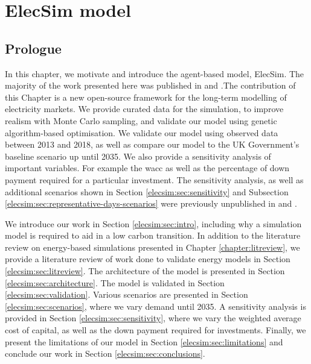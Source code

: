 \chapter{ElecSim model}
\label{chapter:elecsim}

\ifpdf
\graphicspath{{Chapter3/Figs/Raster/}{Chapter3/Figs/PDF/}{Chapter3/Figs/}}
\else
\graphicspath{{Chapter3/Figs/Vector/}{Chapter3/Figs/}}
\fi

\section*{Prologue}

In this chapter, we motivate and introduce the agent-based model, ElecSim. The majority of the work presented here was published in \cite{Kell} and \cite{Kell2020}.The contribution of this Chapter is a new open-source framework for the long-term modelling of electricity markets. We provide curated data for the simulation, to improve realism with Monte Carlo sampling, and validate our model using genetic algorithm-based optimisation. We validate our model using observed data between 2013 and 2018, as well as compare our model to the UK Government's baseline scenario up until 2035. We also provide a sensitivity analysis of important variables. For example the \acrfull{wacc} as well as the percentage of down payment required for a particular investment. The sensitivity analysis, as well as additional scenarios shown in Section \ref{elecsim:sec:sensitivity} and Subsection \ref{elecsim:sec:representative-days-scenarios} were previously unpublished in \cite{Kell} and \cite{Kell2020}.

We introduce our work in Section \ref{elecsim:sec:intro}, including why a simulation model is required to aid in a low carbon transition. In addition to the literature review on energy-based simulations presented in Chapter \ref{chapter:litreview}, we provide a literature review of work done to validate energy models in Section \ref{elecsim:sec:litreview}. The architecture of the model is presented in Section \ref{elecsim:sec:architecture}. The model is validated in Section \ref{elecsim:sec:validation}. Various scenarios are presented in Section \ref{elecsim:sec:scenarios}, where we vary demand until 2035. A sensitivity analysis is provided in Section \ref{elecsim:sec:sensitivity}, where we vary the weighted average cost of capital, as well as the down payment required for investments. Finally, we present the limitations of our model in Section \ref{elecsim:sec:limitations} and conclude our work in Section \ref{elecsim:sec:conclusions}.


